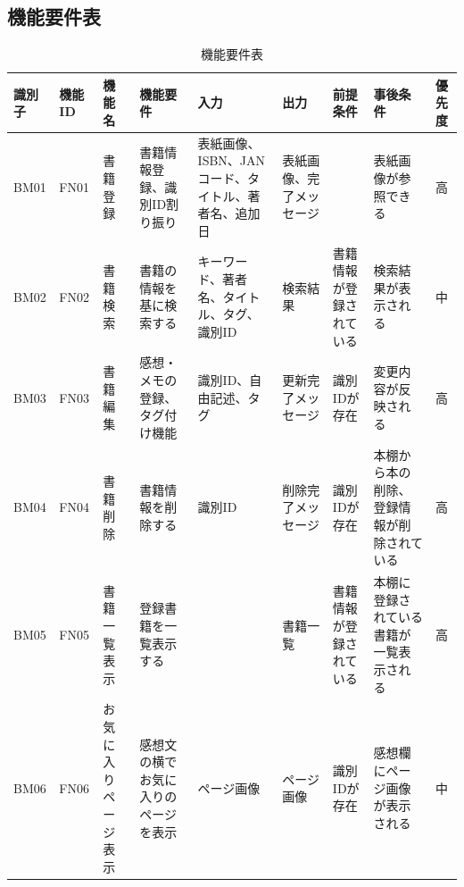 \documentclass[a4paper, 11pt, titlepage]{jsarticle}
\begin{document}
\subsection{機能要件表}
\begin{table}[htbp]
  \centering
  \begin{tabular}{|>{\centering\arraybackslash}m{0.9cm}|>{\centering\arraybackslash}m{0.9cm}|>{\centering\arraybackslash}m{1.3cm}|>{\centering\arraybackslash}m{1.5cm}|>{\centering\arraybackslash}m{1.8cm}|>{\centering\arraybackslash}m{1.2cm}|>{\centering\arraybackslash}m{1.3cm}|>{\centering\arraybackslash}m{1.3cm}|>{\centering\arraybackslash}m{0.3cm}|}
    \hline
    \textbf{識別子} & \textbf{機能ID} & \textbf{機能名} & \textbf{機能要件} & \textbf{入力} & \textbf{出力} & \textbf{前提条件} & \textbf{事後条件} & \textbf{優先度} \\
    \hline\hline
    BM01 & FN01 & 書籍登録 & 書籍情報登録、識別ID割り振り & 表紙画像、ISBN、JANコード、タイトル、著者名、追加日 & 表紙画像、完了メッセージ & & 表紙画像が参照できる & 高 \\
    \hline
    BM02 & FN02 & 書籍検索 & 書籍の情報を基に検索する & キーワード、著者名、タイトル、タグ、識別ID & 検索結果 & 書籍情報が登録されている & 検索結果が表示される & 中 \\
    \hline
    BM03 & FN03 & 書籍編集 & 感想・メモの登録、タグ付け機能 & 識別ID、自由記述、タグ & 更新完了メッセージ & 識別IDが存在 & 変更内容が反映される & 高 \\
    \hline
    BM04 & FN04 & 書籍削除 & 書籍情報を削除する & 識別ID & 削除完了メッセージ & 識別IDが存在 & 本棚から本の削除、登録情報が削除されている & 高 \\
    \hline
    BM05 & FN05 & 書籍一覧表示 & 登録書籍を一覧表示する & & 書籍一覧 & 書籍情報が登録されている & 本棚に登録されている書籍が一覧表示される & 高 \\
    \hline
    BM06 & FN06 & お気に入りページ表示 & 感想文の横でお気に入りのページを表示 & ページ画像 & ページ画像 & 識別IDが存在 & 感想欄にページ画像が表示される & 中 \\
    \hline
  \end{tabular}
  \caption{機能要件表}
  \label{tab:functions}
\end{table}

\clearpage
\end{document}
